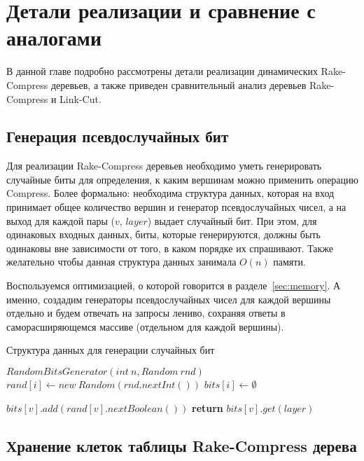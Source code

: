 \chapter{Детали реализации и сравнение с аналогами}

В данной главе подробно рассмотрены детали реализации динамических Rake-Compress деревьев, а также приведен сравнительный анализ деревьев Rake-Compress и Link-Cut.

\FloatBarrier
\section{Генерация псевдослучайных бит}    
  
Для реализации Rake-Compress деревьев необходимо уметь генерировать случайные биты для определения, к каким вершинам можно применить операцию Compress.
Более формально: необходима структура данных, которая на вход принимает общее количество вершин и генератор псевдослучайных чисел, 
а на выход для каждой пары ($v$, $layer$) выдает случайный бит. 
При этом, для одинаковых входных данных, биты, которые генерируются, должны быть одинаковы вне зависимости от того, в каком порядке их спрашивают.
Также желательно чтобы данная структура данных занимала $O(n)$ памяти.

Воспользуемся оптимизацией, о которой говорится в разделе~\ref{sec:memory}. 
А именно, создадим генераторы псевдослучайных чисел для каждой вершины отдельно и будем отвечать на запросы лениво, сохраняя ответы в саморасширяющемся массиве (отдельном для каждой вершины).


\FloatBarrier
\begin{algorithm}
\caption{Структура данных для генерации случайных бит}\label{algo:random_gen}
\begin{algorithmic}[1]
\State $RandomBitsGenerator(int \ n, Random \ rnd)$
	\State $rand[i] \gets new \ Random(rnd.nextInt())$ 
	\State $bits[i] \gets \emptyset$
\EndFor

		\State $bits[v].add(rand[v].nextBoolean())$
	\EndWhile
	\State \textbf{return} $bits[v].get(layer)$
\EndProcedure

\end{algorithmic}
\end{algorithm}

\FloatBarrier
\section{Хранение клеток таблицы Rake-Compress дерева}      

